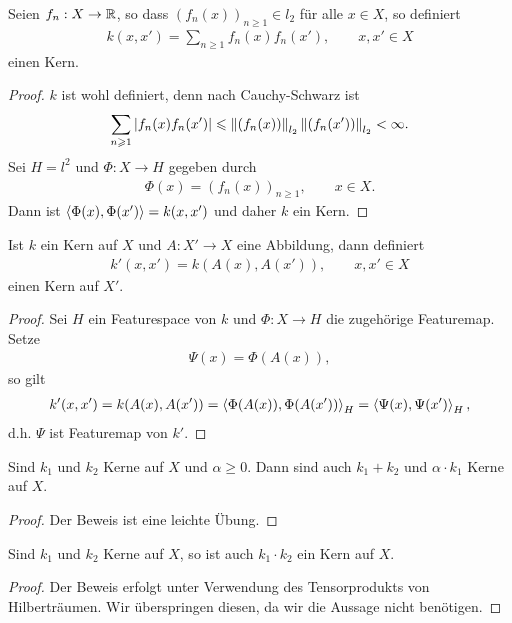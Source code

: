 \begin{lem}
\label{prop:5.1.2}
Seien $f_n:X\to\mathbb{R}$, so dass $(f_n(x))_{n\ge 1}\in l_2$ für alle $x\in X$, so
definiert
\begin{align*}
k(x,x') = \sum_{n\ge 1} f_n(x)f_n(x'),\qquad x,x'\in X
\end{align*}
einen Kern.\fishhere
\end{lem}
\begin{proof}
$k$ ist wohl definiert, denn nach Cauchy-Schwarz ist
\begin{align*}
\sum_{n\geqslant 1} \left|f_n(x)f_n(x')\right|
\leqslant \left\|(f_n(x))\right\|_{l_2}\left\|(f_n(x'))\right\|_{l_2} < \infty.
\end{align*}
Sei $H=l^2$ und $\Phi: X\to H$ gegeben durch
\begin{align*}
\Phi(x) = (f_n(x))_{n\ge 1},\qquad x\in X.
\end{align*}
Dann ist $\left\langle\Phi(x),\Phi(x')\right\rangle = k(x,x')$ und daher $k$ ein Kern.\qedhere
\end{proof}

\begin{lem}
\label{prop:5.1.3}
Ist $k$ ein Kern auf $X$ und $A:X'\to X$ eine Abbildung, dann definiert
\begin{align*}
k'(x,x') = k(A(x),A(x')),\qquad x,x'\in X
\end{align*}
einen Kern auf $X'$.\fishhere
\end{lem}
\begin{proof}
Sei $H$ ein Featurespace von $k$ und $\Phi: X\to H$ die zugehörige Featuremap.
Setze
\begin{align*}
\Psi(x) = \Phi(A(x)), 
\end{align*}
so gilt
\begin{align*}
k'(x,x') = k(A(x),A(x')) = \left\langle\Phi(A(x)),\Phi(A(x'))\right\rangle_H
= \left\langle\Psi(x),\Psi(x')\right\rangle_H,
\end{align*}
d.h. $\Psi$ ist Featuremap von $k'$.\qedhere
\end{proof}

\begin{lem}
\label{prop:5.1.4}
Sind $k_1$ und $k_2$ Kerne auf $X$ und $\alpha\ge 0$. Dann sind auch $k_1+k_2$
und $\alpha \cdot k_1$ Kerne auf $X$.\fishhere
\end{lem}
\begin{proof}
Der Beweis ist eine leichte Übung.\qedhere
\end{proof}

\begin{lem}
\label{prop:5.1.5}
Sind $k_1$ und $k_2$ Kerne auf $X$, so ist auch $k_1\cdot k_2$ ein Kern auf
$X$.\fishhere
\end{lem}
\begin{proof}
Der Beweis erfolgt unter Verwendung des Tensorprodukts von Hilberträumen. Wir
überspringen diesen, da wir die Aussage nicht benötigen.\qedhere
\end{proof}

